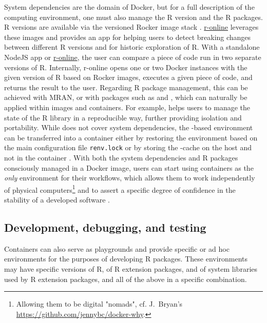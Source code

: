 System dependencies are the domain of Docker, but for a full description
of the computing environment, one must also manage the R version and the
R packages. R versions are available via the versioned Rocker image
stack \citep{RJ-2017-065}.
\href{https://github.com/ColinFay/ronline}{r-online} leverages these
images and provides an app for helping users to detect breaking changes
between different R versions and for historic exploration of R. With a
standalone NodeJS app or
\href{https://srv.colinfay.me/r-online}{r-online}, the user can compare
a piece of code run in two separate versions of R. Internally, r-online
opens one or two Docker instances with the given version of R based on
Rocker images, executes a given piece of code, and returns the result to
the user. Regarding R package management, this can be achieved with
MRAN, or with packages such as 
\citep{cran_checkpoint} and  \citep{renv2019}, which can
naturally be applied within images and containers. For example,
 helps users to manage the state of the R library in a
reproducible way, further providing isolation and portability. While
 does not cover system dependencies, the -based
environment can be transferred into a container either by restoring the
environment based on the main configuration file \texttt{renv.lock} or
by storing the -cache on the host and not in the container
\citep{ushey_using_2019}. With both the system dependencies and R
packages consciously managed in a Docker image, users can start using
containers as the \emph{only} environment for their workflows, which
allows them to work independently of physical
computers\footnote{Allowing them to be digital "nomads", cf. J.~Bryan's \href{https://github.com/jennybc/docker-why}{https://github.com/jennybc/docker-why}.}
and to assert a specific degree of confidence in the stability of a
developed software
\citep[cf. \texttt{README.Rmd} in][]{marwick_research_2017}.

\hypertarget{development-debugging-and-testing}{%
\subsection{Development, debugging, and
testing}\label{development-debugging-and-testing}}

\label{development}

Containers can also serve as playgrounds and provide specific or ad hoc
environments for the purposes of developing R packages. These
environments may have specific versions of R, of R extension packages,
and of system libraries used by R extension packages, and all of the
above in a specific combination.

